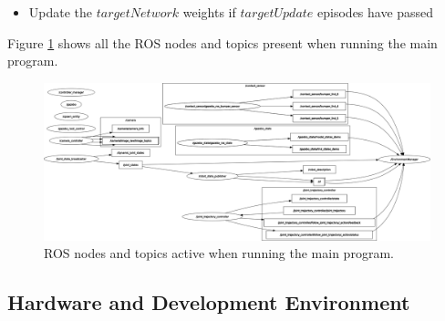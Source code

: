 \documentclass[12pt,oneside]{article}
\begin{document}
\begin{enumerate}
\begin{itemize}
\begin{itemize}
\begin{tcolorbox}[]
\begin{verbatim}
currentQValues = policyNetwork(states).gather(dim=1, index=actions.unsqueeze(-1))
nextQValues = targetNetwork(nextStates).max(dim=1)[0].detach()
targetQValues = nextQValues * gamma + rewards
\end{verbatim}
\end{tcolorbox}
			\item Compute the loss using mean square error between $currentQValues$ and $targetQValues$ and apply gradient descent to update the weights in the $policyNetwork$.
\begin{tcolorbox}[]
\begin{verbatim}
loss = F.mse_loss(currentQValues, targetQValues.unsqueeze(1))
optimizer.zero_grad()
loss.backward()
optimizer.step()
\end{verbatim}
\end{tcolorbox}
			\item Stop if the $environment.done$ variable is true or if the maximum number of episodes has been reached.
		\end{itemize} 
		\item Update the $targetNetwork$ weights if $targetUpdate$ episodes have passed
	\end{itemize}
\end{enumerate}
Figure \ref{fig:rosgraphlatest} shows all the ROS nodes and topics present when running the main program.
\begin{figure}[H]
\centering
\includegraphics[width=0.99\linewidth]{rosgraph_latest}
\caption{ROS nodes and topics active when running the main program.}
\label{fig:rosgraphlatest}
\end{figure}

\subsection{Hardware and Development Environment} 
\end{document}
